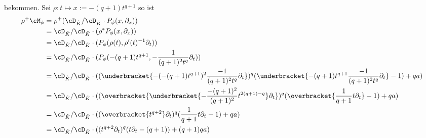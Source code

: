 bekommen.
Sei $\rho:t\mapsto x:=-(q+1) t^{q+1}$ so ist
\begin{align*}
\rho^+\cM_\phi &= \rho^+(\cD_{\hat K}/\cD_{\hat K}\cdot P_\phi(x,\partial_x))\\
  &=\cD_{\hat K}/\cD_{\hat K}\cdot(\rho^*P_\phi(x,\partial_x))\\
  &=\cD_{\hat K}/\cD_{\hat K}\cdot(P_\phi(\rho(t),\rho'(t)^{-1}\partial_t))\\
  &=\cD_{\hat K}/\cD_{\hat K}
    \cdot(P_\phi(-(q+1) t^{q+1},-\frac{1}{(q+1)^2t^q}\partial_t))\\
  &=\cD_{\hat K}/\cD_{\hat K} \cdot
    ((\underbracket{-(-(q+1) t^{q+1})^2\frac{-1}{(q+1)^2t^{q}}\partial_t})^{q}
    (\underbracket{-(q+1) t^{q+1}\frac{-1}{(q+1)^2t^{q}}\partial_t}-1)+qa)\\
  &=\cD_{\hat K}/\cD_{\hat K}
    \cdot((\overbracket{
      \underbracket{-\frac{-(q+1)^2}{(q+1)^2}t^{2(q+1)-q}}\partial_t})^{q}
    (\overbracket{\frac{1}{q+1}t\partial_t}-1)+qa)\\
  &=\cD_{\hat K}/\cD_{\hat K}
    \cdot((\overbracket{t^{q+2}}\partial_t)^{q}
    (\frac{1}{q+1}t\partial_t-1)+qa)\\
  &=\cD_{\hat K}/\cD_{\hat K}
    \cdot((t^{q+2}\partial_t)^{q}
    (t\partial_t-(q+1))+(q+1)qa)
\end{align*}
\begin{comment}
muss noch gezeigt werden, dass dies ein Meromorpher Zusammenhang???
\end{comment}
\begin{comment}
Bei \cite{sabbah_Fourier-local}:\\
Sei $\rho:t\mapsto x:=-\frac{t^{q+1}}{qa}$ so ist
\begin{align*}
\rho^+\cM_\phi &= \rho^+(\cD_{\hat K}/\cD_{\hat K}\cdot P_\phi(x,\partial_x))\\
  &=\cD_{\hat K}/\cD_{\hat K}\cdot(\rho^*P_\phi(x,\partial_x))\\
  &=\cD_{\hat K}/\cD_{\hat K}\cdot(P_\phi(\rho(t),\rho'(t)^{-1}\partial_t))\\
  &=\cD_{\hat K}/\cD_{\hat K}
    \cdot(P_\phi(-\frac{t^{q+1}}{qa}, -\frac{qa}{(q+1)t^q}\partial_t))
\end{align*}
mit
\begin{align*}
P_\phi(-\frac{t^{q+1}}{qa}, -\frac{qa}{(q+1)t^q}\partial_t)
  &= (-(-\frac{t^{q+1}}{qa})^2(-\frac{qa}{(q+1)t^q}\partial_t))^q
    (-\frac{t^{q+1}}{qa}(-\frac{qa}{(q+1)t^q}\partial_t)-1)+qa\\
  &= ((\frac{t^{q+1}}{qa})^2\frac{qa}{(q+1)t^q}\partial_t)^q
    (\frac{t^{q+1}}{qa}\frac{qa}{(q+1)t^q}\partial_t-1)+qa\\
  &= (\frac{(t^{q+1})^2}{qa(q+1)t^q}\partial_t)^q
    (\frac{t^{q+1}}{(q+1)t^q}\partial_t-1)+qa\\
  &= (\frac{t^{2q+2-q}}{qa(q+1)}\partial_t)^q
    (\frac{t^{q+1-q}}{(q+1)}\partial_t-1)+qa\\
  &= (\frac{t^{q+2}}{qa(q+1)}\partial_t)^q
    (\frac{1}{(q+1)}t\partial_t-1)+qa\\
\end{align*}
\end{comment}
